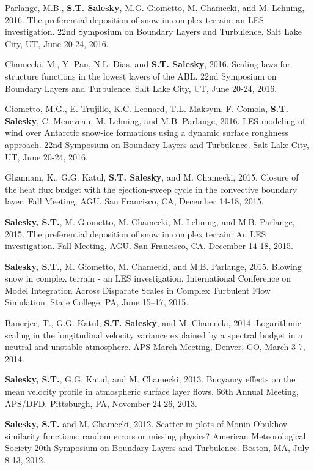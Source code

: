 \documentclass[11pt,letterpaper]{article}
\begin{document}
Parlange, M.B., \textbf{S.T. Salesky}, M.G. Giometto, M. Chamecki, and M.
Lehning, 2016.  The preferential deposition of snow in complex terrain: an LES
investigation.  22nd Symposium on Boundary Layers and Turbulence. Salt Lake
City, UT, June 20-24, 2016.

Chamecki, M., Y. Pan, N.L. Dias, and \textbf{S.T. Salesky}, 2016. Scaling laws for
structure functions in the lowest layers of the ABL.  22nd Symposium on
Boundary Layers and Turbulence. Salt Lake City, UT, June 20-24, 2016.

Giometto, M.G., E. Trujillo, K.C. Leonard, T.L. Maksym, F. Comola, \textbf{S.T.
  Salesky}, C. Meneveau, M. Lehning, and M.B. Parlange, 2016.  LES modeling of
wind over Antarctic snow-ice formations using a dynamic surface roughness
approach.  22nd Symposium on Boundary Layers and Turbulence. Salt Lake City,
UT, June 20-24, 2016.

Ghannam, K., G.G. Katul, \textbf{S.T. Salesky}, and M. Chamecki, 2015. Closure of the heat flux budget with the ejection-sweep cycle in the convective boundary layer. Fall Meeting, AGU. San Francisco, CA, December 14-18, 2015.

\textbf{Salesky, S.T.}, M. Giometto, M. Chamecki, M. Lehning, and M.B. Parlange, 2015. The preferential deposition of snow in complex terrain: An LES investigation. Fall Meeting, AGU. San Francisco, CA, December 14-18, 2015.

\textbf{Salesky, S.T.}, M. Giometto, M. Chamecki, and M.B. Parlange, 2015. Blowing snow in complex terrain - an LES investigation. International Conference on Model Integration Across Disparate Scales in Complex Turbulent Flow Simulation. State College, PA, June 15--17, 2015. 

Banerjee, T., G.G. Katul, \textbf{S.T. Salesky}, and M. Chamecki, 2014. Logarithmic scaling in the longitudinal velocity variance explained by a spectral budget in a neutral and unstable atmosphere. APS March Meeting, Denver, CO, March 3-7, 2014. 

\textbf{Salesky, S.T.}, G.G. Katul, and M. Chamecki, 2013. Buoyancy effects on the mean velocity profile in atmospheric surface layer flows. 66th Annual Meeting, APS/DFD. Pittsburgh, PA, November 24-26, 2013. 

\textbf{Salesky, S.T.} and M. Chamecki, 2012. Scatter in plots of Monin-Obukhov similarity functions: random errors or missing physics? American Meteorological Society 20th Symposium on Boundary Layers and Turbulence. Boston, MA, July 8-13, 2012. 
\end{document}
